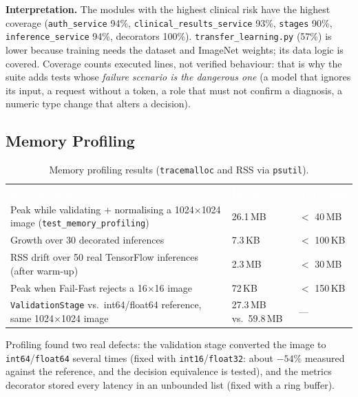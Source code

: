 \documentclass[12pt,a4paper]{article}
\newcommand{\fp}[1]{\nolinkurl{#1}}
\newcommand{\hd}[1]{\textcolor{white}{\textbf{#1}}}
\begin{document}
\noindent\textbf{Interpretation.} The modules with the highest clinical risk have the highest coverage
(\texttt{auth\_service} 94\%, \texttt{clinical\_results\_service} 93\%, \texttt{stages} 90\%, \texttt{inference\_service} 94\%, decorators 100\%).
\fp{transfer_learning.py} (57\%) is lower because training needs the dataset and ImageNet weights; its data logic is covered.
Coverage counts executed lines, not verified behaviour: that is why the suite adds tests whose \emph{failure scenario is the dangerous one}
(a model that ignores its input, a request without a token, a role that must not confirm a diagnosis, a numeric type change that alters a decision).

\subsection{Memory Profiling}

\begin{table}[H]
\centering
\caption{Memory profiling results (\texttt{tracemalloc} and RSS via \texttt{psutil}).}
\label{tab:memory}
\renewcommand{\arraystretch}{1.3}
\begin{tabularx}{\textwidth}{Y C{3.0cm} C{2.3cm}}
\hd{Measurement} & \hd{Result} & \hd{Threshold} \\
Peak while validating + normalising a 1024$\times$1024 image (\texttt{test\_memory\_profiling}) & 26.1\,MB & $<$ 40\,MB \\
Growth over 30 decorated inferences & 7.3\,KB & $<$ 100\,KB \\
RSS drift over 50 real TensorFlow inferences (after warm-up) & 2.3\,MB & $<$ 30\,MB \\
Peak when Fail-Fast rejects a 16$\times$16 image & 72\,KB & $<$ 150\,KB \\
\texttt{ValidationStage} vs.\ int64/float64 reference, same 1024$\times$1024 image & 27.3\,MB vs.\ 59.8\,MB & --- \\
\end{tabularx}
\end{table}

\noindent Profiling found two real defects: the validation stage converted the image to
\texttt{int64}/\texttt{float64} several times (fixed with \texttt{int16}/\texttt{float32}: about $-54\%$ measured against the reference, and the decision equivalence is tested), and the
metrics decorator stored every latency in an unbounded list (fixed with a ring buffer).
\end{document}
